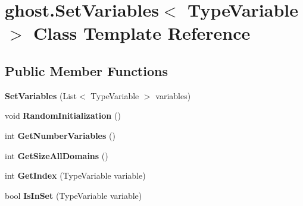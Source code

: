 \hypertarget{classghost_1_1SetVariables_3_01TypeVariable_01_4}{\section{ghost.\-Set\-Variables$<$ Type\-Variable $>$ Class Template Reference}
\label{classghost_1_1SetVariables_3_01TypeVariable_01_4}
}
\subsection*{Public Member Functions}
\begin{DoxyCompactItemize}
\item 
\hypertarget{classghost_1_1SetVariables_3_01TypeVariable_01_4_aa4d6976b36cca380b1581584047f7ca1}{{\bfseries Set\-Variables} (List$<$ Type\-Variable $>$ variables)}\label{classghost_1_1SetVariables_3_01TypeVariable_01_4_aa4d6976b36cca380b1581584047f7ca1}

\item 
\hypertarget{classghost_1_1SetVariables_3_01TypeVariable_01_4_a1d8990709787aadaf0e5180aa0cf7414}{void {\bfseries Random\-Initialization} ()}\label{classghost_1_1SetVariables_3_01TypeVariable_01_4_a1d8990709787aadaf0e5180aa0cf7414}

\item 
\hypertarget{classghost_1_1SetVariables_3_01TypeVariable_01_4_ab56b789dea78a2a6b831b567efc3b3d0}{int {\bfseries Get\-Number\-Variables} ()}\label{classghost_1_1SetVariables_3_01TypeVariable_01_4_ab56b789dea78a2a6b831b567efc3b3d0}

\item 
\hypertarget{classghost_1_1SetVariables_3_01TypeVariable_01_4_a2473f5c049d319412e81b440493d67e8}{int {\bfseries Get\-Size\-All\-Domains} ()}\label{classghost_1_1SetVariables_3_01TypeVariable_01_4_a2473f5c049d319412e81b440493d67e8}

\item 
\hypertarget{classghost_1_1SetVariables_3_01TypeVariable_01_4_a2f8e4117bea08d33024b3da31baf5a09}{int {\bfseries Get\-Index} (Type\-Variable variable)}\label{classghost_1_1SetVariables_3_01TypeVariable_01_4_a2f8e4117bea08d33024b3da31baf5a09}

\item 
\hypertarget{classghost_1_1SetVariables_3_01TypeVariable_01_4_a3554ef33a14c339391af02d0a04723b0}{bool {\bfseries Is\-In\-Set} (Type\-Variable variable)}\label{classghost_1_1SetVariables_3_01TypeVariable_01_4_a3554ef33a14c339391af02d0a04723b0}


\end{DoxyCompactItemize}
